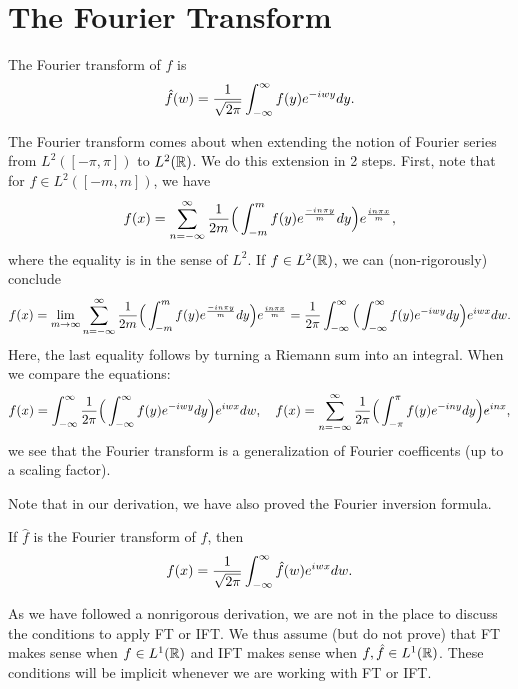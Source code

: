 \section{The Fourier Transform}
\begin{dfn}
    \label{FT}
    The Fourier transform of $f$ is
    \[
        \hat{f}(w)= \frac{1}{\sqrt{2\pi}}\int_{-\infty}^{\infty}f(y)e^{-iwy}dy.
    \]
\end{dfn}
The Fourier transform comes about when extending the notion of Fourier series from $L^2([-\pi,\pi])$ to $L^2({\mathbb R})$. We do this extension in 2 steps. First, note that for $f \in L^2([-m,m])$, we have
\[
    f(x) = \sum^{\infty}_{n=-\infty} \frac{1}{2m}
    \Big( \int_{-m}^m f(y)e^{ \frac{-in\pi y}{m}} dy \Big)
    e^{ \frac{in\pi x}{m}},
\]
where the equality is in the sense of $L^2$. If $f \in L^2({\mathbb R})$, we can (non-rigorously) conclude
\[
    f(x) = \lim_{m \rightarrow \infty}
    \sum^{\infty}_{n=-\infty} \frac{1}{2m}
    \Big( \int_{-m}^m f(y)e^{ \frac{-in\pi y}{m}} dy \Big)
    e^{ \frac{in\pi x}{m}}
    =
    \frac{1}{2\pi} \int_{-\infty}^\infty 
    \Big( \int_{-\infty}^\infty f(y)e^{-iwy} dy\Big)
    e^{iwx}dw.
\]
Here, the last equality follows by turning a Riemann sum into an integral. When we compare the equations:
\[
    f(x) = 
    \int_{-\infty}^\infty 
    \frac{1}{2\pi}
    \Big( \int_{-\infty}^\infty f(y)e^{-iwy} dy\Big)
    e^{iwx} dw, \quad
    f(x) = 
    \sum^{\infty}_{n=-\infty} \frac{1}{2\pi}
    \Big( \int_{-\pi}^\pi f(y)e^{-iny} dy \Big)
    e^{inx},
\]
we see that the Fourier transform is a generalization of Fourier coefficents (up to a scaling factor).

Note that in our derivation, we have also proved the Fourier inversion formula.
\begin{thm}
    If $\hat{f}$ is the Fourier transform of $f$, then
    \[
        f(x) = \frac{1}{\sqrt{2\pi}}\int_{-\infty}^\infty \hat{f}(w) e^{iwx} dw.
    \]
\end{thm}
\begin{remark}
    As we have followed a nonrigorous derivation, we are not in the place to discuss the conditions to apply FT or IFT. We thus assume (but do not prove) that FT makes sense when $f \in L^1({\mathbb R})$ and IFT makes sense when $f, \hat{f} \in L^1({\mathbb R})$. These conditions will be implicit whenever we are working with FT or IFT.
\end{remark}


